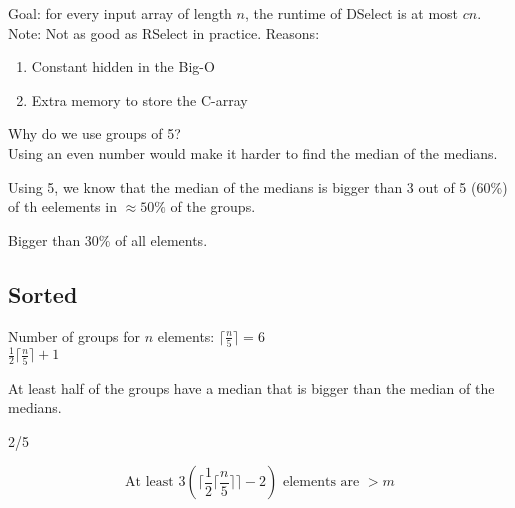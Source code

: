 \documentclass{article}
\begin{document}
Goal: for every input array of length $n$, the runtime of DSelect is at most
$cn$. \\
Note: Not as good as RSelect in practice.
Reasons:
\begin{enumerate}
    \item Constant hidden in the Big-O
    \item Extra memory to store the C-array
\end{enumerate}

Why do we use groups of 5? \\
Using an even number would make it harder to find the median of the medians.

Using 5, we know that the median of the medians is bigger than 3 out of 5 (60\%) of th eelements in \(\approx 50\%\) of the groups.

Bigger than \(30\%\) of all elements.

\subsection*{Sorted}
Number of groups for $n$ elements: \(\lceil \frac{n}{5} \rceil = 6 \) \\
\(\frac{1}{2} \lceil \frac{n}{5} \rceil + 1\)

At least half of the groups have a median that is bigger than the median of the medians.

2/5

\begin{equation*}
    \text{At least }3 \left(\lceil \frac{1}{2} \lceil \frac{n}{5} \rceil \rceil - 2\right) \text{ elements are } > m
\end{equation*}
\end{document}
